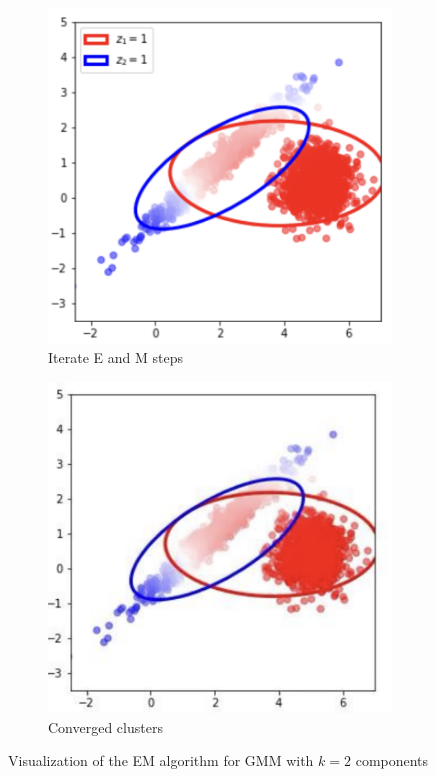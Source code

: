 \documentclass[11pt]{article}
\begin{document}
\begin{figure}[!ht]
	\vspace{0.2em}

	\begin{subfigure}[t]{0.3\textwidth}
		\centering
		\includegraphics[width=\textwidth]{../imgs/gmm_p5.png}
		\caption*{\small Iterate E and M steps}
	\end{subfigure}
	\hspace{0.15\textwidth}
	\begin{subfigure}[t]{0.3\textwidth}
		\centering
		\includegraphics[width=\textwidth]{../imgs/gmm_p6.png}
		\caption*{\small Converged clusters}
	\end{subfigure}

	\caption{Visualization of the EM algorithm for GMM with $k = 2$ components}
\end{figure}
\end{document}
